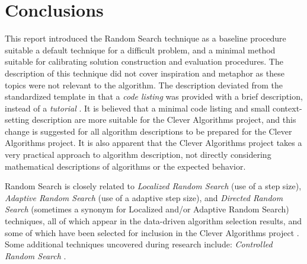 \documentclass[a4paper, 11pt]{article}
\begin{document}
% 
% 
\section{Conclusions}
\label{sec:conclusions}
This report introduced the Random Search technique as a baseline procedure suitable a default technique for a difficult problem, and a minimal method suitable for calibrating solution construction and evaluation procedures.
The description of this technique did not cover inspiration and metaphor as these topics were not relevant to the algorithm. The description deviated from the standardized template in that a \emph{code listing} was provided with a brief description, instead of a \emph{tutorial} \cite{Brownlee2010a}. It is believed that a minimal code listing and small context-setting description are more suitable for the Clever Algorithms project, and this change is suggested for all algorithm descriptions to be prepared for the Clever Algorithms project. 
It is also apparent that the Clever Algorithms project takes a very practical approach to algorithm description, not directly considering mathematical descriptions of algorithms or the expected behavior.  

Random Search is closely related to \emph{Localized Random Search} (use of a step size), \emph{Adaptive Random Search} (use of a adaptive step size), and \emph{Directed Random Search} (sometimes a synonym for Localized and/or Adaptive Random Search) techniques, all of which appear in the data-driven algorithm selection results, and some of which have been selected for inclusion in the Clever Algorithms project \cite{Brownlee2010b}.
Some additional techniques uncovered during research include: \emph{Controlled Random Search} \cite{Price1977}.



\end{document}
